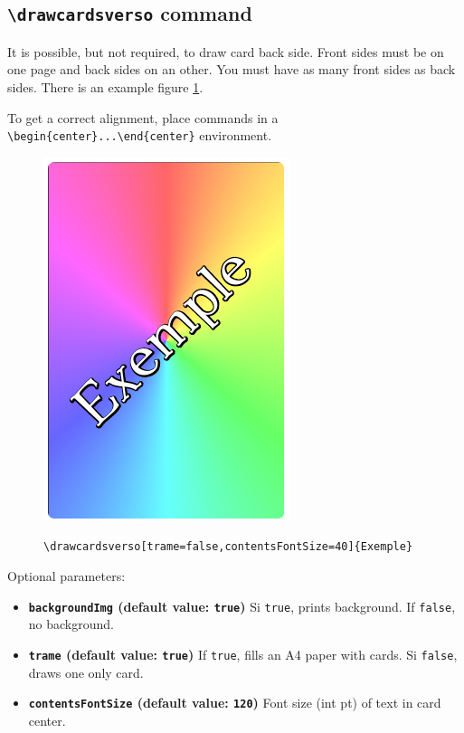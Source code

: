 \documentclass[a4paper, 12pt]{article}
\newcommand{\key}[3]{\textbf{\texttt{#1} (default value: \texttt{#2})} #3}
\newcommand{\commande}[1]{\texttt{\textbackslash#1}}
\begin{document}
	\subsection{\commande{drawcardsverso} command}
It is possible, but not required, to draw card back side. Front sides must be on one page and back sides on an other. You must have as many front sides as back sides. There is an example figure \ref{fig:verso}.

To get a correct alignment, place commands in a  \verb!\begin{center}...\end{center}! environment.
\begin{figure}[h]\begin{center}
	\caption{\commande{drawcardsverso[trame=false,contentsFontSize=40]\{Exemple\}}}
	\includegraphics{screen02.png}\label{fig:verso}
\end{center}\end{figure}

Optional parameters:
\begin{itemize}
	\item \key{backgroundImg}{true}{Si \texttt{true}, prints background. If \texttt{false}, no background.}
	\item \key{trame}{true}{If \texttt{true}, fills an A4 paper with cards. Si \texttt{false}, draws one only card.}
	\item \key{contentsFontSize}{120}{Font size (int pt) of text in card center.}
\end{itemize}
\end{document}
